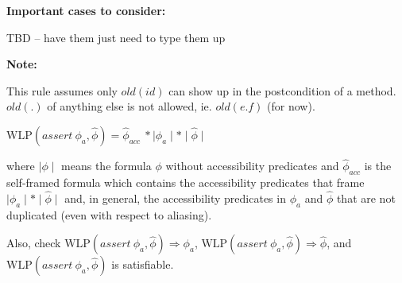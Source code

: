 \documentclass {article}
\newcommand{\fphi}{\widehat{\phi}}
\newcommand{\imp}{\Rightarrow}
\newcommand{\wlp}[2]{\text{WLP}(#1,#2)}
\begin{document}
\textbf{Important cases to consider:}

TBD -- have them just need to type them up
%

\textbf{Note:}

This rule assumes only $old(id)$ can show up in the postcondition of a method. $old(.)$ of anything else is not allowed, ie. $old(e.f)$ (for now).

\vspace{0.5cm}

$\wlp{assert\ \phi_a}{\fphi} = \fphi_{acc} \ \ast \mid \phi_a \mid \ast \mid \fphi \mid$


where $\mid \phi \mid$ means the formula $\phi$ without accessibility predicates and $\fphi_{acc}$ is the self-framed formula which contains the accessibility predicates that frame $\mid \phi_a \mid \ast \mid \fphi \mid$ and, in general, the accessibility predicates in $\phi_a$ and $\fphi$ that are not duplicated (even with respect to aliasing).

Also, check $\wlp{assert\ \phi_a}{\fphi} \imp \phi_a$, $\wlp{assert\ \phi_a}{\fphi} \imp \fphi$, and $\wlp{assert\ \phi_a}{\fphi}$ is satisfiable.
\end{document}
